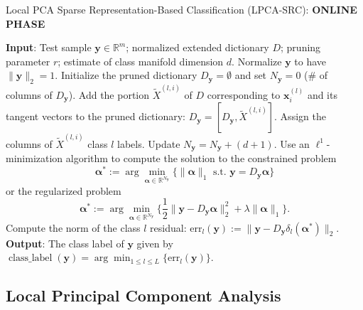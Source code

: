 \documentclass[review]{elsarticle}
\newcommand{\classlabel}{\operatorname{class\_label}}
\begin{document}
\begin{algorithm}
\caption{Local PCA Sparse Representation-Based Classification (LPCA-SRC): \textbf{ONLINE PHASE}}
\label{lpca_src_online} 
\begin{algorithmic}[1]
\STATE \textbf{Input}: Test sample $\bm{y} \in \mathbb{R}^m$; normalized extended dictionary $D$; pruning parameter $r$; estimate of class manifold dimension $d$. 
\STATE Normalize $\bm{y}$ to have $\|\bm{y}\|_2 = 1$.
\STATE Initialize the pruned dictionary $D_{\bm{y}} = \emptyset$ and set $N_{\bm{y}} = 0$ (\# of columns of $D_{\bm{y}}$).
\STATE Add the portion $\tilde{X}^{(l,i)}$ of $D$ corresponding to $\bm{x}_i^{(l)}$ and its tangent vectors to the pruned dictionary: $D_{\bm{y}} = [D_{\bm{y}},\tilde{X}^{(l,i)}]$. Assign the columns of $\tilde{X}^{(l,i)}$ class $l$ labels. Update $N_{\bm{y}} = N_{\bm{y}} + (d+1)$.
\ENDIF
\ENDFOR
\ENDFOR
\STATE Use an $\ell^1$-minimization algorithm to compute the solution to the constrained problem
\begin{equation} \label{eq:l1_exact}
\bm{\alpha}^* := \arg \min_{\bm{\alpha}\in \mathbb{R}^{N_{\bm{y}}}} \big \{ \|\bm{\alpha}\|_1 \text{ s.t. } \bm{y} = D_{\bm{y}} \bm{\alpha}\big\}
\end{equation}
or the regularized problem
\begin{equation} \label{eq:l1_approx}
\bm{\alpha}^* := \arg \min_{\bm{\alpha}\in \mathbb{R}^{N_{\bm{y}}}} \Big \{ \frac{1}{2}\|\bm{y}-D_{\bm{y}} \bm{\alpha}\|_2^2+ \lambda\|\bm{\alpha}\|_1\Big\}.
\end{equation}
\STATE Compute the norm of the class $l$ residual: 
$\mathrm{err}_l(\bm{y}) := \big\|\bm{y} - D_{\bm{y}}\delta_l(\bm{\alpha}^*)\big\|_2$.
\ENDFOR
\STATE \textbf{Output}: The class label of $\bm{y}$ given by 
$\classlabel(\bm{y}) = \arg \min_{1\leq l \leq L} \{\mathrm{err}_l(\bm{y})\}$.
\end{algorithmic}
\end{algorithm}

\subsection{Local Principal Component Analysis}
\end{document}
